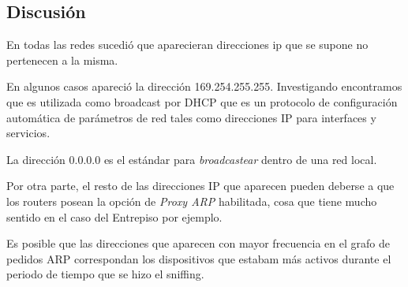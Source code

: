 \subsection{Discusi\'on}

        En todas las redes sucedi\'o que aparecieran direcciones ip que se supone
no pertenecen a la misma. 

        En algunos casos apareci\'o la direcci\'on 169.254.255.255. Investigando
encontramos que es utilizada como broadcast por DHCP que es un protocolo de 
configuraci\'on autom\'atica de par\'ametros de red tales como direcciones IP
para interfaces y servicios.

        La direcci\'on 0.0.0.0 es el est\'andar para \emph{broadcastear} dentro
de una red local.

        Por otra parte, el resto de las direcciones IP que aparecen pueden deberse
a que los routers posean la opci\'on de \emph{Proxy ARP} habilitada, cosa que tiene 
mucho sentido en el caso del Entrepiso por ejemplo.

        Es posible que las direcciones que aparecen con mayor frecuencia en el grafo
de pedidos ARP correspondan los dispositivos que estabam m\'as activos durante el periodo
de tiempo que se hizo el sniffing.

